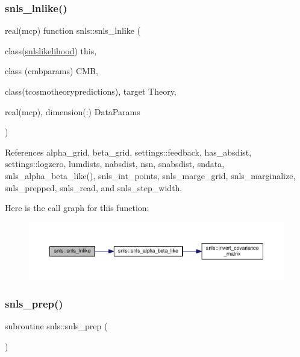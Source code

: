 \mbox{\label{namespacesnls_a9983ad3e174e1ba1d0b862b463a8df40}} 
\subsubsection{\texorpdfstring{snls\+\_\+lnlike()}{snls\_lnlike()}}
{\footnotesize\ttfamily real(mcp) function snls\+::snls\+\_\+lnlike (\begin{DoxyParamCaption}\item[{class(\mbox{\hyperlink{structsnls_1_1snlslikelihood}{snlslikelihood}})}]{this,  }\item[{class (cmbparams)}]{C\+MB,  }\item[{class(tcosmotheorypredictions), target}]{Theory,  }\item[{real(mcp), dimension(\+:)}]{Data\+Params }\end{DoxyParamCaption})\hspace{0.3cm}{\ttfamily [private]}}



References alpha\+\_\+grid, beta\+\_\+grid, settings\+::feedback, has\+\_\+absdist, settings\+::logzero, lumdists, nabsdist, nsn, snabsdist, sndata, snls\+\_\+alpha\+\_\+beta\+\_\+like(), snls\+\_\+int\+\_\+points, snls\+\_\+marge\+\_\+grid, snls\+\_\+marginalize, snls\+\_\+prepped, snls\+\_\+read, and snls\+\_\+step\+\_\+width.

Here is the call graph for this function\+:
\nopagebreak
\begin{figure}[H]
\begin{center}
\leavevmode
\includegraphics[width=350pt]{namespacesnls_a9983ad3e174e1ba1d0b862b463a8df40_cgraph}
\end{center}
\end{figure}
\mbox{\label{namespacesnls_aa7659f323fe80a70e09e7c1b3257cf5b}} 
\subsubsection{\texorpdfstring{snls\+\_\+prep()}{snls\_prep()}}
{\footnotesize\ttfamily subroutine snls\+::snls\+\_\+prep (\begin{DoxyParamCaption}{ }\end{DoxyParamCaption})\hspace{0.3cm}{\ttfamily [private]}}




